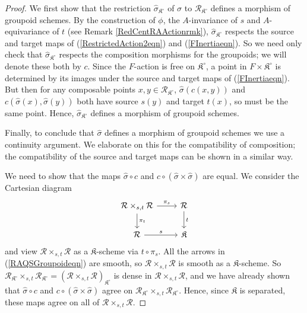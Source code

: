 \documentclass{amsart}
\theoremstyle{remark}
\numberwithin{theorem}{section}
\numberwithin{equation}{section}
\begin{document}
\begin{proof}
We first show that the restriction $\hat{\sigma}_{\mathfrak{K}^\circ}$ of $\sigma$ to $\mathcal R_{\mathfrak{K}^\circ}$ defines a morphism of groupoid schemes. By the construction of $\phi$, the $A$-invariance of $s$ and $A$-equivariance of $t$ (see Remark \ref{RedCentRAActionrmk}), $\hat{\sigma}_{\mathfrak{K}^\circ}$ respects the source and target maps of (\ref{RestrictedAction2eqn}) and (\ref{FInertiaeqn}). So we need only check that $\hat{\sigma}_{\mathfrak{K}^\circ}$ respects the composition morphisms for the groupoids; we will denote these both by $c$. Since the $F$-action is free on $\mathfrak{K}^\circ$, a point in $F \times \mathfrak{K}^\circ$ is determined by its images under the source and target maps of (\ref{FInertiaeqn}). But then for any composable points $x, y \in \mathcal R_{\mathfrak{K}^\circ}$, $\hat{\sigma}(c(x,y))$ and $c(\hat{\sigma}(x),\hat{\sigma}(y))$ both have source $s(y)$ and target $t(x)$, so must be the same point. Hence, $\hat{\sigma}_{\mathfrak{K}^\circ}$ defines a morphism of groupoid schemes.

Finally, to conclude that $\hat{\sigma}$ defines a morphism of groupoid schemes we use a continuity argument. We elaborate on this for the compatibility of composition; the compatibility of the source and target maps can be shown in a similar way.

We need to show that the maps $\hat{\sigma} \circ c$ and $c \circ (\hat{\sigma} \times \hat{\sigma})$ are equal. We consider the Cartesian diagram
\begin{equation}\label{RAQSGroupoideqn}
\begin{tikzcd}
{\mathcal R \times_{s,t} \mathcal R} \arrow[r, "\pi_s"] \arrow[d, "\pi_t"] & \mathcal R \arrow[d, "t"] \\
\mathcal R \arrow[r, "s"]                                                  & \mathfrak{K}             
\end{tikzcd} 
\end{equation}
and view $\mathcal R \times_{s,t}\mathcal R$ as a $\mathfrak{K}$-scheme via $t \circ \pi_s$. All the arrows in (\ref{RAQSGroupoideqn}) are smooth, so $\mathcal R \times_{s,t}\mathcal R$ is smooth as a $\mathfrak{K}$-scheme. So $\mathcal R_{\mathfrak{K}^\circ} \times_{s,t} \mathcal R_{\mathfrak{K}^\circ} = (\mathcal R \times_{s,t} \mathcal R)_{\mathfrak{K}^\circ}$ is dense in $\mathcal R \times_{s,t} \mathcal R$, and we have already shown that $\hat{\sigma} \circ c$ and $c \circ (\hat{\sigma} \times \hat{\sigma})$ agree on $\mathcal R_{\mathfrak{K}^\circ} \times_{s,t} \mathcal R_{\mathfrak{K}^\circ}$. Hence, since $\mathfrak{K}$ is separated, these maps agree on all of $\mathcal R \times_{s,t}\mathcal R$.
\end{proof}
\end{document}

